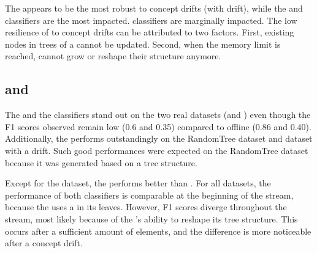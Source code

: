 
The \hoeffdingtree appears to be the most robust to concept drifts
(\banosdataset with drift), while the \mondrianforest and \naivebayes
classifiers are the most impacted. \mcnn classifiers are marginally impacted.
The low resilience of \mondrianforest to concept drifts can be attributed to
two factors. First, existing nodes in trees of a \mondrianforest cannot be updated.
Second, when the memory limit is reached, \mondriantrees cannot grow
or reshape their structure anymore.


\subsection{\hoeffdingtree and \naivebayes}

The \naivebayes and the \hoeffdingtree classifiers stand out on the two real datasets
(\banosdataset and \recofitdataset) even though the F1 scores observed remain
low (0.6 and 0.35) compared to offline \knn (0.86 and 0.40). Additionally, the
\hoeffdingtree performs outstandingly on the RandomTree dataset and
\banosdataset dataset with a drift. Such good performances were expected on the
RandomTree dataset because it was generated based on a tree structure.

Except for the \banosdataset dataset, the \hoeffdingtree performs better
than \naivebayes. For all datasets, the performance of both classifiers is
comparable at the beginning of the stream, because the \hoeffdingtree uses
a \naivebayes in its leaves.  However, F1 scores diverge throughout the
stream, most likely because of the \hoeffdingtree's ability to reshape its
tree structure.  This occurs after a sufficient amount of elements, and the
difference is more noticeable after a concept drift.

